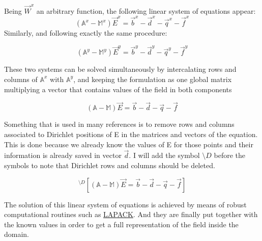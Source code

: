 Being $\vec{W}^x$ an arbitrary function, the following linear system of equations appear:
\begin{equation}
\left(\mathbb{A}^x-\mathbb{M}^x\right)\vec{E}^x = \vec{b}^x-\vec{d}^x-\vec{q}^x-\vec{f}^x \label{eq:harmonic_eq_sys_x}
\end{equation}
Similarly, and following exactly the same procedure:

\begin{equation}
\left(\mathbb{A}^y-\mathbb{M}^y\right)\vec{E}^y = \vec{b}^y-\vec{d}^y-\vec{q}^y-\vec{f}^y \label{eq:harmonic_eq_sys_y}
\end{equation}


These two systems can be solved simultaneously by intercalating rows and columns of $\mathbb{A}^x$ with $\mathbb{A}^y$, and keeping the formulation as one global matrix multiplying a vector that contains values of the field in both components


\begin{equation*}
\left(\mathbb{A}-\mathbb{M}\right)\vec{E} = \vec{b}-\vec{d}-\vec{q}-\vec{f}
\end{equation*}

Something that is used in many references is to remove rows and columns associated to Dirichlet positions of E in the matrices and vectors of the equation. This is done because we already know the values of E for those points and their information is already saved in vector $\vec{d}$. I will add the symbol $\setminus D$ before the symbols to note that Dirichlet rows and columns should be deleted.

\begin{equation*}
^{\setminus D}\left[\left(\mathbb{A}-\mathbb{M}\right)\vec{E}= \vec{b}-\vec{d}-\vec{q}-\vec{f}\right]
\label{eq:harmonic_eq_dirichlet}
\end{equation*}

The solution of this linear system of equations is achieved by means of robust computational routines such as \href{http://www.netlib.org/lapack/}{LAPACK}. And they are finally put together with the known values in order to get a full representation of the field inside the domain.
